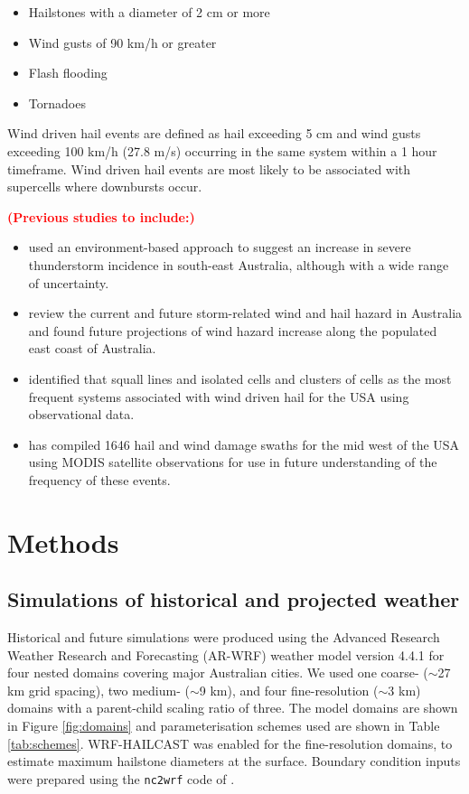 \documentclass[]{agujournal2019}\usepackage[]{graphicx}\usepackage[]{xcolor}
\newcommand*{\todo}[1]{\textbf{\textcolor{red}{(#1)}}}
\begin{document}
\begin{itemize}
\item Hailstones with a diameter of 2 cm or more
\item Wind gusts of 90 km/h or greater
\item Flash flooding
\item Tornadoes
\end{itemize}

Wind driven hail events are defined as hail exceeding 5 cm and wind gusts exceeding 100 km/h (27.8 m/s) occurring in the same system within a 1 hour timeframe. Wind driven hail events are most likely to be associated with supercells where downbursts occur. 

\todo{Previous studies to include:}
\begin{itemize}
\item \cite{Allen_JC_2014} used an environment-based approach to suggest an increase in severe thunderstorm incidence in south-east Australia, although with a wide range of uncertainty.
\item \cite{Walsh_CC_2016} review the current and future storm-related wind and hail hazard in Australia and found future projections of wind hazard increase along the populated east coast of Australia.
\item \cite{Carletta_2010} identified that squall lines and isolated cells and clusters of cells as the most frequent systems associated with wind driven hail for the USA using observational data.
\item \cite{Bell_WF_2023} has compiled 1646 hail and wind damage swaths for the mid west of the USA using MODIS satellite observations for use in future understanding of the frequency of these events.
\end{itemize}

\section{Methods}

\subsection{Simulations of historical and projected weather}

Historical and future simulations were produced using the Advanced Research Weather Research and Forecasting (AR-WRF) weather model version 4.4.1 \cite{Skamarock_2021} for four nested domains covering major Australian cities. We used one coarse- ($\sim$27 km grid spacing), two medium- ($\sim$9 km), and four fine-resolution ($\sim$3 km) domains with a parent-child scaling ratio of three. The model domains are shown in Figure \ref{fig:domains} and parameterisation schemes used are shown in Table \ref{tab:schemes}. WRF-HAILCAST \cite{Adams-Selin_WF_2019} was enabled for the fine-resolution domains, to estimate maximum hailstone diameters at the surface. Boundary condition inputs were prepared using the \texttt{nc2wrf} code of . 
\end{document}
